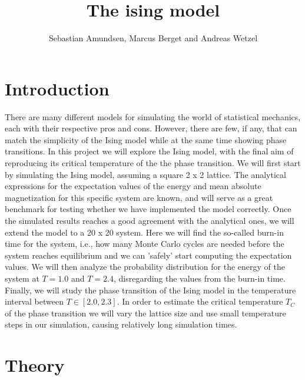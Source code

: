 \documentclass{article}
\begin{document}
\title{The ising model}
\author{Sebastian Amundsen, Marcus Berget and Andreas Wetzel}

\maketitle

\begin{abstract}

\end{abstract}

\begin{multicols}{2}

\section{Introduction}

There are many different models for simulating the world of statistical mechanics, each with their respective pros and cons. However, there are few, if any, that can match the simplicity of the Ising model while at the same time showing phase transitions. In this project we will explore the Ising model, with the final aim of reproducing its critical temperature of the the phase transition. We will first start by simulating the Ising model, assuming a square 2 x 2 lattice. The analytical expressions for the expectation values of the energy and mean absolute magnetization for this specific system are known, and will serve as a great benchmark for testing whether we have implemented the model correctly. Once the simulated results reaches a good agreement with the analytical ones, we will extend the model to a 20 x 20 system. Here we will find the so-called burn-in time for the system, i.e., how many Monte Carlo cycles are needed before the system reaches equilibrium and we can 'safely' start computing the expectation values. We will then analyze the probability distribution for the energy of the system at $T=1.0$ and $T=2.4$, disregarding the values from the burn-in time. Finally, we will study the phase transition of the Ising model in the temperature interval between $T\in[2.0, 2.3]$. In order to estimate the critical temperature $T_C$ of the phase transition we will vary the lattice size and use small temperature steps in our simulation, causing relatively long simulation times.


\section{Theory}


\end{multicols}
\end{document}
